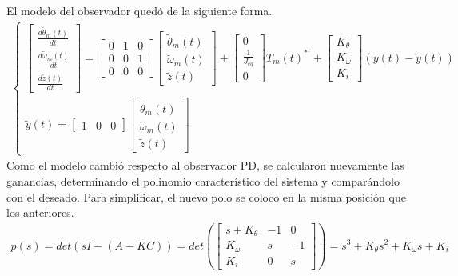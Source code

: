 \documentclass[a4paper, 10pt, onecolumn,journal]{ieeeconf}
\begin{document}
El modelo del observador quedó de la siguiente forma.
\begin{align}
	\begin{cases}
		\begin{bmatrix}
			\frac{d \tilde{\theta}_m(t)}{dt} \\ 
			\frac{d \tilde{\omega}_m(t)}{dt} \\
			\frac{d \tilde{z}(t)}{dt}
		\end{bmatrix} = 
		\begin{bmatrix}
			0 & 1 & 0\\ 
			0 & 0 & 1 \\
			0 & 0 & 0
		\end{bmatrix}
		\begin{bmatrix}
			{\tilde{\theta}}_m(t) \\ 
			{\tilde{\omega}}_m(t) \\
			\tilde{z}(t)
		\end{bmatrix} + 
		\begin{bmatrix}
			0 \\ 
			\frac{1}{J_{eq}}\\
			0
		\end{bmatrix} {T_m(t)}^{*'} + 
		\begin{bmatrix}
			K_{\theta} \\
			K_{\omega}\\
			K_{i}
		\end{bmatrix} \left(y(t) - \tilde{y}(t) \right) \\
		\tilde{y}(t) = \begin{bmatrix}
			1 & 0 & 0
		\end{bmatrix} 
		\begin{bmatrix}
			{\tilde{\theta}}_m(t) \\ 
			{\tilde{\omega}}_m(t) \\
			\tilde{z}(t)
		\end{bmatrix}
	\end{cases}\label{ecuacion matricial de observador nuevo}
\end{align}
Como el modelo cambió respecto al observador PD, se calcularon nuevamente las ganancias, determinando el polinomio característico del sistema y comparándolo con el deseado. Para simplificar, el nuevo polo se coloco en la misma posición que los anteriores.
\begin{align}
	p(s) = det\left(s I - \left( A - KC\right)  \right) = det\left(\begin{bmatrix}
		s + K_{\theta} & -1 & 0\\ 
		K_{\omega} & s & -1 \\
		K_{i} & 0 & s
	\end{bmatrix}  
	\right) = s^3 + K_{\theta} s^2 + K_{\omega} s + K_{i} \label{polinomeo caracteristico de observador nuevo}
\end{align}
\end{document}
